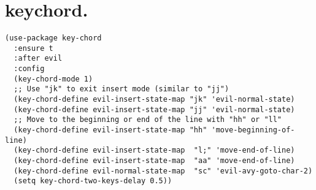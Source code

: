 \documentclass[11pt]{article}
\begin{document}
\section{keychord.}
\label{sec:org7ded1cc}
\begin{verbatim}
(use-package key-chord
  :ensure t
  :after evil
  :config
  (key-chord-mode 1)
  ;; Use "jk" to exit insert mode (similar to "jj")
  (key-chord-define evil-insert-state-map "jk" 'evil-normal-state)
  (key-chord-define evil-insert-state-map "jj" 'evil-normal-state)
  ;; Move to the beginning or end of the line with "hh" or "ll"
  (key-chord-define evil-insert-state-map "hh" 'move-beginning-of-line)
  (key-chord-define evil-insert-state-map  "l;" 'move-end-of-line)
  (key-chord-define evil-insert-state-map  "aa" 'move-end-of-line)
  (key-chord-define evil-normal-state-map  "sc" 'evil-avy-goto-char-2)
  (setq key-chord-two-keys-delay 0.5))
\end{verbatim}
\end{document}
